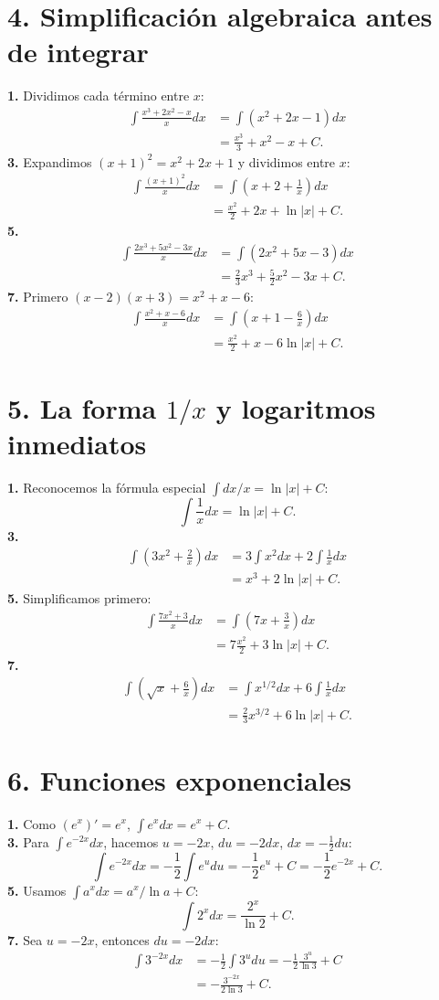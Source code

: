 \documentclass[11pt]{article}
\begin{document}
\section*{4. Simplificación algebraica antes de integrar}
\textbf{1.} Dividimos cada término entre $x$:
\begin{align*}\int\frac{x^3+2x^2-x}{x}dx&=\int(x^2+2x-1)dx\\&=\frac{x^3}{3}+x^2-x+C.\end{align*}
\textbf{3.} Expandimos $(x+1)^2=x^2+2x+1$ y dividimos entre $x$:
\begin{align*}\int\frac{(x+1)^2}{x}dx&=\int\left(x+2+\frac1x\right)dx\\&=\frac{x^2}{2}+2x+\ln|x|+C.\end{align*}
\textbf{5.}\begin{align*}\int\frac{2x^3+5x^2-3x}{x}dx&=\int(2x^2+5x-3)dx\\&=\frac23x^3+\frac52x^2-3x+C.\end{align*}
\textbf{7.} Primero $(x-2)(x+3)=x^2+x-6$:
\begin{align*}\int\frac{x^2+x-6}{x}dx&=\int\left(x+1-\frac6x\right)dx\\&=\frac{x^2}{2}+x-6\ln|x|+C.\end{align*}

\section*{5. La forma $1/x$ y logaritmos inmediatos}
\textbf{1.} Reconocemos la fórmula especial $\int dx/x=\ln|x|+C$:
\[\int\frac1x dx=\ln|x|+C.\]
\textbf{3.}\begin{align*}\int\left(3x^2+\frac2x\right)dx&=3\int x^2dx+2\int\frac1x dx\\&=x^3+2\ln|x|+C.\end{align*}
\textbf{5.} Simplificamos primero:
\begin{align*}\int\frac{7x^2+3}{x}dx&=\int\left(7x+\frac3x\right)dx\\&=7\frac{x^2}{2}+3\ln|x|+C.\end{align*}
\textbf{7.}\begin{align*}\int\left(\sqrt{x}+\frac6x\right)dx&=\int x^{1/2}dx+6\int\frac1x dx\\&=\frac23x^{3/2}+6\ln|x|+C.\end{align*}

\section*{6. Funciones exponenciales}
\textbf{1.} Como $(e^x)'=e^x$, $\displaystyle\int e^x dx=e^x+C$.\\
\textbf{3.} Para $\int e^{-2x}dx$, hacemos $u=-2x$, $du=-2dx$, $dx=-\frac12du$:
\[\int e^{-2x}dx=-\frac12\int e^u du=-\frac12e^u+C=-\frac12e^{-2x}+C.\]
\textbf{5.} Usamos $\int a^x dx=a^x/\ln a+C$:
\[\int2^x dx=\frac{2^x}{\ln2}+C.\]
\textbf{7.} Sea $u=-2x$, entonces $du=-2dx$:
\begin{align*}\int3^{-2x}dx&=-\frac12\int3^u du=-\frac12\frac{3^u}{\ln3}+C\\&=-\frac{3^{-2x}}{2\ln3}+C.\end{align*}
\end{document}
